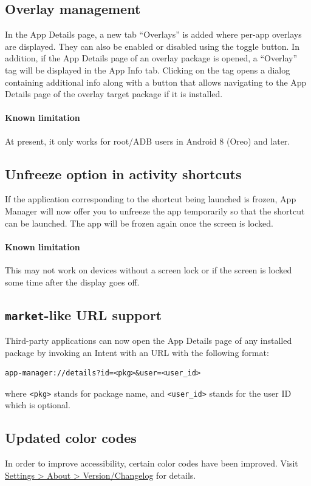 \subsection{Overlay management}
In the App Details page, a new tab ``Overlays'' is added where per-app overlays are displayed. They
can also be enabled or disabled using the toggle button. In addition, if the App Details page of an
overlay package is opened, a ``Overlay'' tag will be displayed in the App Info tab. Clicking on the
tag opens a dialog containing additional info along with a button that allows navigating to the
App Details page of the overlay target package if it is installed.

\paragraph{Known limitation} At present, it only works for root/ADB users in Android 8 (Oreo) and
later.

\subsection{Unfreeze option in activity shortcuts}
If the application corresponding to the shortcut being launched is frozen, App Manager will now
offer you to unfreeze the app temporarily so that the shortcut can be launched. The app will be
frozen again once the screen is locked.

\paragraph{Known limitation} This may not work on devices without a screen lock or if the screen is
locked some time after the display goes off.

\subsection{\texttt{market}-like URL support}
Third-party applications can now open the App Details page of any installed package by invoking an
Intent with an URL with the following format:

\begin{verbatim}
app-manager://details?id=<pkg>&user=<user_id>
\end{verbatim}

where \texttt{<pkg>} stands for package name, and \texttt{<user\_id>} stands for the user ID which
is optional.

\subsection{Updated color codes}
In order to improve accessibility, certain color codes have been improved. Visit
\href{app-manager://settings/about/version}{Settings > About > Version/Changelog} for details.

